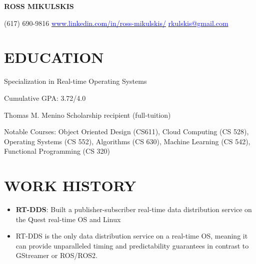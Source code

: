 \documentclass[10pt]{article}
\begin{document}
\begin{FlushLeft}

  \begin{center}
    {\bf ROSS MIKULSKIS}
  \end{center}

  (617) 690-9816 \hfill \hspace{25pt} \href{www.linkedin.com/in/ross-mikulskis/}{\textcolor{blue}{www.linkedin.com/in/ross-mikulskis/}} \hfill \href{mailto:rkulskis@gmail.com}{\textcolor{blue}{rkulskis@gmail.com}}
  \section{EDUCATION}
  \vspace{1.5em}
  \begin{itemize}{
      \item Specialization in Real-time Operating Systems
    }
  \end{itemize}
  
  \begin{itemize}{
    \item Cumulative GPA: 3.72/4.0
    \item Thomas M. Menino Scholarship recipient (full-tuition)
    \item Notable Courses: Object Oriented Design (CS611), Cloud Computing (CS 528), \\ Operating Systems (CS 552), Algorithms (CS 630), Machine Learning (CS 542), \\ Functional Programming (CS 320)
    }
  \end{itemize}

  
\section{WORK HISTORY}

\begin{itemize}
\item \textbf{RT-DDS}: Built a publisher-subscriber real-time data distribution service on the Quest real-time OS and Linux
  \item RT-DDS is the only data distribution service on a real-time OS, meaning it can provide unparalleled timing and predictability guarantees in contrast to GStreamer or ROS/ROS2.
\end{itemize}


\end{FlushLeft}
\end{document}
